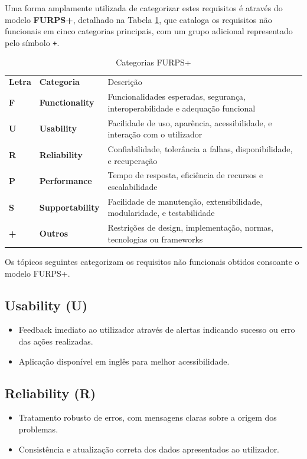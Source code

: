 Uma forma amplamente utilizada de categorizar estes requisitos é através do modelo \textbf{FURPS+}, detalhado na Tabela \ref{tab:furps}, que cataloga os requisitos não funcionais em cinco categorias principais, com um grupo adicional representado pelo símbolo \texttt{+}.

\begin{table}[H]
    \renewcommand{\arraystretch}{1.2}
    \setlength{\tabcolsep}{10pt}
    \centering
    \begin{tabular}{>{\bfseries}p{1cm} >{\bfseries}p{2.5cm} p{10cm}}
        \rowcolor{blue!50}
        Letra & Categoria & Descrição \\
        F & Functionality & Funcionalidades esperadas, segurança, interoperabilidade e adequação funcional \\
        U & Usability & Facilidade de uso, aparência, acessibilidade, e interação com o utilizador \\
        R & Reliability & Confiabilidade, tolerância a falhas, disponibilidade, e recuperação \\
        P & Performance & Tempo de resposta, eficiência de recursos e escalabilidade \\
        S & Supportability & Facilidade de manutenção, extensibilidade, modularidade, e testabilidade \\
        + & Outros & Restrições de design, implementação, normas, tecnologias ou frameworks \\
    \end{tabular}
    \caption{Categorias FURPS+}
    \label{tab:furps}
\end{table}

Os tópicos seguintes categorizam os requisitos não funcionais obtidos consoante o modelo FURPS+.

\subsection{Usability (U)}
\begin{itemize}
    \item Feedback imediato ao utilizador através de alertas indicando sucesso ou erro das ações realizadas.
    \item Aplicação disponível em inglês para melhor acessibilidade.
\end{itemize}

\subsection{Reliability (R)}
\begin{itemize}
    \item Tratamento robusto de erros, com mensagens claras sobre a origem dos problemas.
    \item Consistência e atualização correta dos dados apresentados ao utilizador.
\end{itemize}

